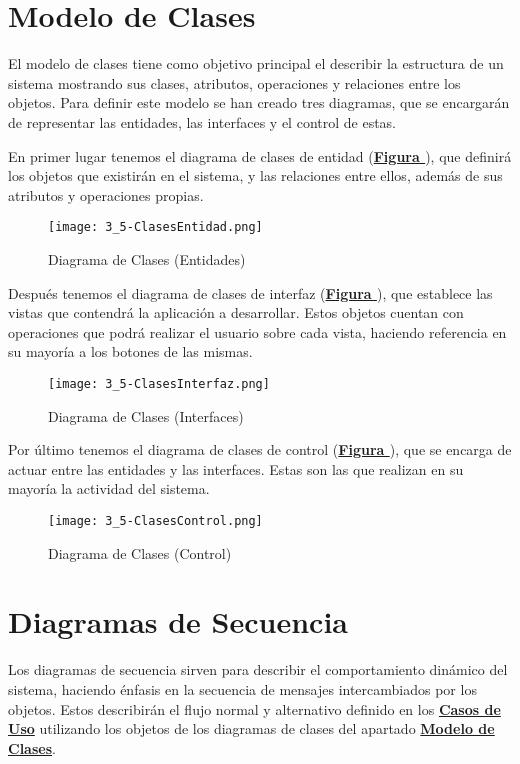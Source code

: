 \pagebreak
\section{Modelo de Clases}
\label{mc} El modelo de clases tiene como objetivo principal el describir la estructura de un sistema mostrando sus clases, atributos, operaciones y relaciones entre los objetos. Para definir este modelo se han creado tres diagramas, que se encargarán de representar las entidades, las interfaces y el control de estas.

\addtocounter{figura}{1}
En primer lugar tenemos el diagrama de clases de entidad (\textbf{\hyperref[fig:ClasesEntidad]{Figura }}), que definirá los objetos que existirán en el sistema, y las relaciones entre ellos, además de sus atributos y operaciones propias.
\begin{figure}[!htbp]
  \centering
  \texttt{[image: 3\_5-ClasesEntidad.png]}
  \caption{Diagrama de Clases (Entidades)}
  \label{fig:ClasesEntidad}
\end{figure}
\FloatBarrier

\addtocounter{figura}{1}
Después tenemos el diagrama de clases de interfaz (\textbf{\hyperref[fig:ClasesInterfaz]{Figura }}), que establece las vistas que contendrá la aplicación a desarrollar. Estos objetos cuentan con operaciones que podrá realizar el usuario sobre cada vista, haciendo referencia en su mayoría a los botones de las mismas.
\begin{figure}[!htbp]
  \centering
  \texttt{[image: 3\_5-ClasesInterfaz.png]}
  \caption{Diagrama de Clases (Interfaces)}
  \label{fig:ClasesInterfaz}
\end{figure}
\FloatBarrier

\addtocounter{figura}{1}
Por último tenemos el diagrama de clases de control (\textbf{\hyperref[fig:ClasesControl]{Figura }}), que se encarga de actuar entre las entidades y las interfaces. Estas son las que realizan en su mayoría la actividad del sistema.
\begin{figure}[!htbp]
  \centering
  \texttt{[image: 3\_5-ClasesControl.png]}
  \caption{Diagrama de Clases (Control)}
  \label{fig:ClasesControl}
\end{figure}
\FloatBarrier


\pagebreak
\section{Diagramas de Secuencia}
Los diagramas de secuencia sirven para describir el comportamiento dinámico del sistema, haciendo énfasis en la secuencia de mensajes intercambiados por los objetos. Estos describirán el flujo normal y alternativo definido en los \textbf{\hyperref[cu]{Casos de Uso}} utilizando los objetos de los diagramas de clases del apartado \textbf{\hyperref[mc]{Modelo de Clases}}.


